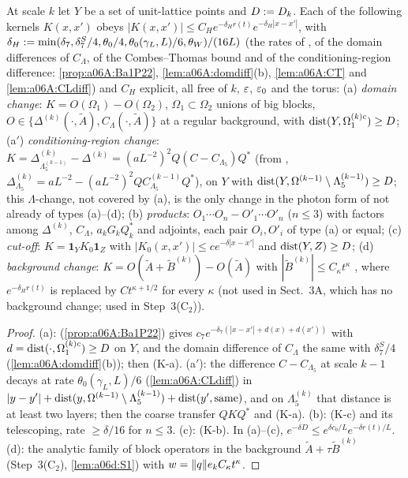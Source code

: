 \begin{lemma}\label{lem:a06d:C21}
At scale $k$ let $Y$ be a set of unit-lattice points and $D:= D_k$. Each of the following kernels $K(x,x')$ obeys $|K(x,x')|\le C_He^{-\delta_Hr(t)}e^{-\delta_H|x-x'|}$, with $\delta_H:=\min(\delta_7,\delta^S_7/4,\theta_0/4,\theta_0(\gamma_L,L)/6,\theta_W)/(16L)$ (the rates of \cite[Prop.~2.2, (2.27), (2.29)]{Ba1}, of the domain differences of $C_\Lambda$, of the Combes--Thomas bound and of the conditioning-region difference: \cref{prop:a06A:Ba1P22}, \cref{lem:a06A:domdiff}(b), \cref{lem:a06A:CT} and \cref{lem:a06A:CLdiff}) and $C_H$ explicit, all free of $k$, $\varepsilon$, $\varepsilon_0$ and the torus:
(a) \emph{domain change}: $K=O(\Omega_1)-O(\Omega_2)$, $\Omega_1\subset\Omega_2$ unions of big blocks, $O\in\{\Delta^{(k)}(\cdot,\tilde A),C_\Lambda(\cdot,\tilde A)\}$ at a regular background, with $\operatorname{dist}(Y,\Omega^{(k)c}_1)\ge D$;
(a$'$) \emph{conditioning-region change}: $K=\Delta^{(k)}_{\Lambda^{(k-1)}_5}-\Delta^{(k)}=(aL^{-2})^2Q(C-C_{\Lambda_5})Q^*$ (from \cite[(2.46)]{Ba2}, $\Delta^{(k)}_{\Lambda_5}=aL^{-2}-(aL^{-2})^2QC^{(k-1)}_{\Lambda_5}Q^*$), on $Y$ with $\operatorname{dist}(Y,\Omega^{(k-1)}\setminus\Lambda^{(k-1)}_5)\ge D$; this $\Lambda$-change, not covered by (a), is the only change in the photon form of \cite[(2.47), p.~568]{Ba2} not already of types (a)--(d);
(b) \emph{products}: $O_1\cdots O_n-O'_1\cdots O'_n$ ($n\le3$) with factors among $\Delta^{(k)}$, $C_\Lambda$, $a_kG_kQ_k^*$ and adjoints, each pair $O_i,O'_i$ of type (a) or equal;
(c) \emph{cut-off}: $K=\mathbf 1_YK_0\mathbf 1_Z$ with $|K_0(x,x')|\le ce^{-\delta|x-x'|}$ and $\operatorname{dist}(Y,Z)\ge D$;
(d) \emph{background change}: $K=O(\tilde A+\tilde B^{(k)})-O(\tilde A)$ with $|\tilde B^{(k)}|\le C_\kappa t^\kappa$ \cite[(2.90)]{Ba2}, where $e^{-\delta_Hr(t)}$ is replaced by $Ct^{\kappa+1/2}$ for every $\kappa$ (not used in Sect.~3A, which has no background change; used in Step~3(C$_2$)).
\end{lemma}

\begin{proof}
(a): \cite[(2.29)]{Ba1} (\cref{prop:a06A:Ba1P22}) gives $c_7e^{-\delta_7(|x-x'|+d(x)+d(x'))}$ with $d=\operatorname{dist}(\cdot,\Omega^{(k)c}_1)\ge D$ on $Y$, and the domain difference of $C_\Lambda$ the same with $\delta^S_7/4$ (\cref{lem:a06A:domdiff}(b)); then (K-a). (a$'$): the difference $C-C_{\Lambda_5}$ at scale $k-1$ decays at rate $\theta_0(\gamma_L,L)/6$ (\cref{lem:a06A:CLdiff}) in $|y-y'|+\operatorname{dist}(y,\Omega^{(k-1)}\setminus\Lambda^{(k-1)}_5)+\operatorname{dist}(y',\text{same})$, and on $\Lambda^{(k)}_5$ that distance is at least two layers; then the coarse transfer $QKQ^*$ and (K-a). (b): (K-c) and its telescoping, rate $\ge\delta/16$ for $n\le3$. (c): (K-b). In (a)--(c), $e^{-\delta D}\le e^{\delta c_b/L}e^{-\delta r(t)/L}$. (d): the analytic family of block operators in the background $\tilde A+\tau\tilde B^{(k)}$ (Step~3(C$_2$), \cref{lem:a06d:S1}) with $w=\lVert q\rVert e_kC_\kappa t^\kappa$.
\end{proof}

